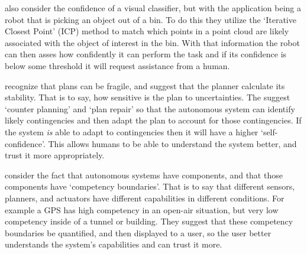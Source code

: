     \citet{Kaipa2015-hy} also consider the confidence of a visual classifier, but with the application being a robot that is picking an object out of a bin. To do this they utilize the `Iterative Closest Point' (ICP) method to match which points in a point cloud are likely associated with the object of interest in the bin. With that information the robot can then asses how confidently it can perform the task and if its confidence is below some threshold it will request assistance from a human. 

    \citet{Kuter2015-qh} recognize that plans can be fragile, and suggest that the planner calculate its stability. That is to say, how sensitive is the plan to uncertainties. The suggest `counter planning' and `plan repair' so that the autonomous system can identify likely contingencies  and then adapt the plan to account for those contingencies. If the system \emph{is} able to adapt to contingencies then it will have a higher `self-confidence'. This allows humans to be able to understand the system better, and trust it more appropriately.

    \citet{Hutchins2015-if} consider the fact that autonomous systems have components, and that those components have `competency boundaries'. That is to say that different sensors, planners, and actuators have different capabilities in different conditions. For example a GPS has high competency in an open-air situation, but very low competency inside of a tunnel or building. They suggest that these competency boundaries be quantified, and then displayed to a user, so the user better understands the system's capabilities and can trust it more.  

